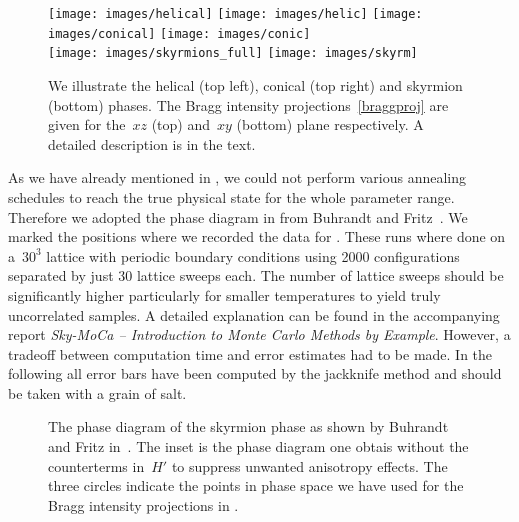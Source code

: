 \begin{figure}[H]
  \centering
  \texttt{[image: images/helical]}
  \hspace{0.5cm}
  \texttt{[image: images/helic]}
  \hfill
  \texttt{[image: images/conical]}
  \hspace{0.5cm}
  \texttt{[image: images/conic]}\\
  \vspace{1.5cm}
  \texttt{[image: images/skyrmions\_full]}
  \hspace{1cm}
  \texttt{[image: images/skyrm]}
  \caption{We illustrate the helical (top left), conical (top right) and
  skyrmion (bottom) phases. The Bragg intensity projections~\eqref{braggproj}
  are given for the~$xz$ (top) and~$xy$ (bottom) plane respectively. A detailed
  description is in the text.}
\label{fig:phases}
\end{figure}

As we have already mentioned in , we could not perform
various annealing schedules to reach the true physical state for the whole
parameter range. Therefore we adopted the phase diagram in 
from Buhrandt and Fritz~\cite{skyrmion}. We marked the positions where we
recorded the data for . These runs where done on a~$30^3$
lattice with periodic boundary conditions using 2000 configurations separated by
just 30 lattice sweeps each. The number of lattice sweeps should be
significantly higher particularly for smaller temperatures to yield truly
uncorrelated samples. A detailed explanation can be found in the accompanying
report \emph{Sky-MoCa -- Introduction to Monte Carlo Methods by Example}.
However, a tradeoff between computation time and error estimates had to be made.
In the following all error bars have been computed by the jackknife method and
should be taken with a grain of salt.

\begin{figure}[H]
  \centering
  \caption{The phase diagram of the skyrmion phase as shown by Buhrandt and
  Fritz in~\cite{skyrmion}. The inset is the phase diagram one obtais without
  the counterterms in~$H'$ to suppress unwanted anisotropy effects. The three
  circles indicate the points in phase space we have used for the Bragg
  intensity projections in .}
\label{fig:diagram}
\end{figure}
%

